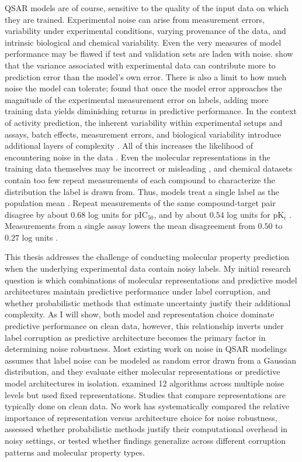 QSAR models are of course, sensitive to the quality of the input data on which they are trained. Experimental noise can arise from measurement errors, variability under experimental conditions, varying provenance of the data, and intrinsic biological and chemical variability. Even the very measures of model performance may be flawed if test and validation sets are laden with noise. \citet{Kolmar2021} show that the variance associated with experimental data can contribute more to prediction error than the model’s own error. There is also a limit to how much noise the model can tolerate; \citet{jorner2021} found that once the model error approaches the magnitude of the experimental measurement error on labels, adding more training data yields diminishing returns in predictive performance. In the context of activity prediction, the inherent variability within experimental setups and assays, batch effects, measurement errors, and biological variability introduce additional layers of complexity \citep{Kolmar2021, Fourches2010}. All of this increases the likelihood of encountering noise in the data \citep{Fang2022}. Even the molecular representations in the training data themselves may be incorrect or misleading \citep{Walters2023}, and chemical datasets contain too few repeat measurements of each compound to characterize the distribution the label is drawn from. Thus, models treat a single label as the population mean \citep{Kolmar2021}. Repeat measurements of the same compound-target pair disagree by about $0.68$ log units for pIC$_{50}$, and by about $0.54$ log units for pK$_i$ \citep{Kalliokoski2013, Kramer2012}. Measurements from a single assay lowers the mean disagreement from $0.50$ to $0.27$ log units \citep{landrum2024}.  

This thesis addresses the challenge of conducting molecular property prediction when the underlying experimental data contain noisy labels. My initial research question is which combinations of molecular representations and predictive model architectures maintain predictive performance under label corruption, and whether probabilistic methods that estimate uncertainty justify their additional complexity. As I will show, both model and representation choice dominate predictive performance on clean data, however, this relationship inverts under label corruption as predictive architecture becomes the primary factor in determining noise robustness.  Most existing work on noise in QSAR modelings assumes that label noise can be modeled as random error drawn from a Gaussian distribution, and they evaluate either molecular representations or predictive model architectures in isolation. \cite{Cortes2015} examined 12 algorithms across multiple noise levels but used fixed representations. Studies that compare representations are typically done on clean data. No work has systematically compared the relative importance of representation versus architecture choice for noise robustness, assessed whether probabilistic methods justify their computational overhead in noisy settings, or tested whether findings generalize across different corruption patterns and molecular property types.

